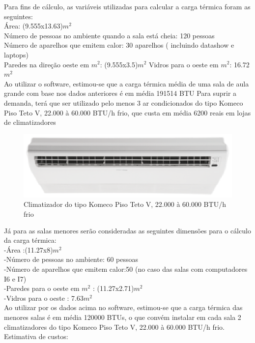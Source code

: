 Para fins de cálculo, as variáveis utilizadas para calcular a carga térmica foram as seguintes:
\\
Área: (9.555x13.63)$m^2$
\\
Número de pessoas no ambiente quando a sala está cheia: 120 pessoas
\\
Número de aparelhos que emitem calor: 30 aparelhos ( incluindo datashow e laptops)
\\
Paredes na direção oeste em $m^2$: (9.555x3.5)$m^2$
Vidros para o oeste em $m^2$: 16.72$m^2$
\\
Ao utilizar o software, estimou-se que a carga térmica média de uma sala de aula grande com base nos dados anteriores é em média 191514 BTU
Para suprir a demanda, terá que ser utilizado pelo menos 3 ar condicionados do tipo
Komeco Piso Teto V, 22.000 à 60.000 BTU/h frio, que custa em média 6200 reais em lojas de climatizadores

\begin{figure}[!ht]
  \centering
  \includegraphics[keepaspectratio=true,scale=1]{figuras/arcondicionado.eps}
  \caption{Climatizador do tipo Komeco Piso Teto V, 22.000 à 60.000 BTU/h frio}
  \label{fig:climatizador}
\end{figure}

Já para as salas menores serão consideradas as seguintes dimensões para o cálculo da carga térmica:
\\
-Área :(11.27x8)$m^2$
\\
-Número de pessoas no ambiente: 60 pessoas
\\
-Número de aparelhos que emitem calor:50 (no caso das salas com computadores I6 e I7)
\\
-Paredes para o oeste em $m^2$ : (11.27x2.71)$m^2$
\\
-Vidros para o oeste : 7.63$m^2$
\\
Ao utilizar por os dados acima no software, estimou-se que a carga térmica das menores salas é em média 120000 BTUs, o que convém instalar em cada sala 2 climatizadores do tipo Komeco Piso Teto V, 22.000 à 60.000 BTU/h frio. Estimativa de custos:

